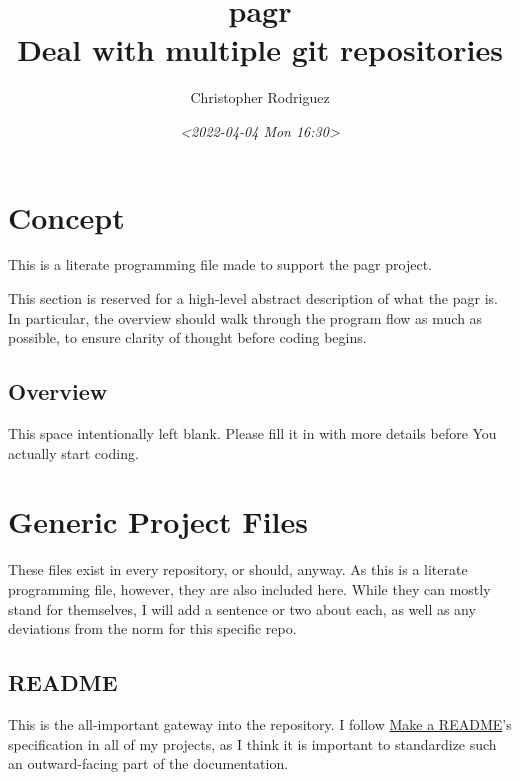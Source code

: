 \documentclass[11pt]{article}
\author{Christopher Rodriguez}
\date{\textit{<2022-04-04 Mon 16:30>}}
\title{pagr\\\medskip
\large Deal with multiple git repositories}
\begin{document}
\maketitle
\tableofcontents

\section{Concept}
\label{sec:org9610f76}
This is a literate programming file made to support the pagr
project.

This section is reserved for a high-level abstract description of what the
pagr is. In particular, the overview should walk through the
program flow as much as possible, to ensure clarity of thought before coding
begins.
\subsection{Overview}
\label{sec:org75aae72}
This space intentionally left blank. Please fill it in with more details before
You actually start coding.

\section{Generic Project Files}
\label{sec:orgc4aadff}
These files exist in every repository, or should, anyway. As this is a literate
programming file, however, they are also included here. While they can mostly
stand for themselves, I will add a sentence or two about each, as well as any
deviations from the norm for this specific repo.

\subsection{README}
\label{sec:orgf109d5e}
This is the all-important gateway into the repository. I follow \href{https://www.makeareadme.com/}{Make a README}'s
specification in all of my projects, as I think it is important to standardize
such an outward-facing part of the documentation.
\end{document}
